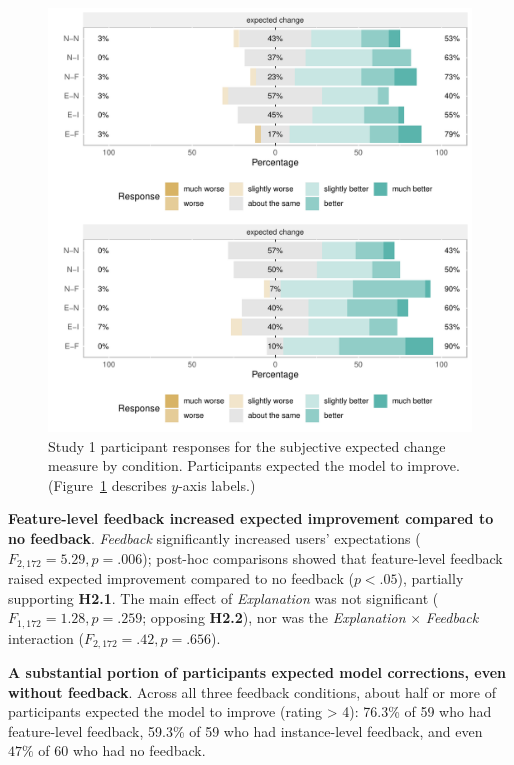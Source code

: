 \begin{figure}
    \centering
    \includegraphics[width=\linewidth]{2020_chi_explanation/figures/exp-plots-study1.pdf}
    \caption{Study 1 participant responses for the subjective expected
change measure by condition. Participants expected
the model to improve. (Figure~\ref{fig:study1measures} describes $y$-axis labels.)}
    \label{fig:study1measures}
\end{figure}

\textbf{Feature-level feedback increased expected improvement compared to no feedback}.
%
\textit{Feedback} significantly increased users' expectations ($F_{2,172}=5.29, p=.006$);  post-hoc comparisons showed that feature-level feedback raised expected improvement compared to no feedback ($p<.05$), partially supporting \textbf{H2.1}. The main effect of \textit{Explanation} was not significant ($F_{1,172}=1.28, p=.259$; opposing \textbf{H2.2}), nor was the \textit{Explanation} $\times$ \textit{Feedback} interaction ($F_{2,172}=.42, p=.656$).

\textbf{A substantial portion of participants expected model corrections, even without feedback}.
%
Across all three feedback conditions, about half or more of participants expected the model to improve (rating > 4): 76.3\% of 59 who had feature-level feedback, 59.3\% of 59 who had instance-level feedback, and even $47\%$ of 60 who had no feedback. 

